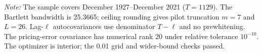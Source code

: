 \begin{table}[H]
\begin{minipage}{0.98\textwidth}
    \par\smallskip
    {\footnotesize\raggedright \textit{Note:} The sample covers December 1927--December 2021 ($T=1129$). The Bartlett bandwidth is 25.3665; ceiling rounding gives pilot truncation $m=7$ and $L=26$. Lag-$\ell$ autocovariances use denominator $T-\ell$ and no prewhitening. The pricing-error covariance has numerical rank 20 under relative tolerance $10^{-10}$. The optimizer is interior; the 0.01 grid and wider-bound checks passed.\par}
  \end{minipage}
\end{table}

